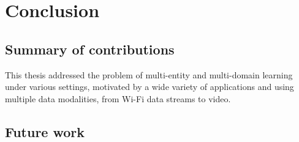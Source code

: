 
\chapter{Conclusion}


\label{chp:conclusion}


\section{Summary of contributions}
This thesis addressed the problem of multi-entity and multi-domain learning under various settings, motivated by a wide variety of applications and using multiple data modalities, from Wi-Fi data streams to video.

\section{Future work}